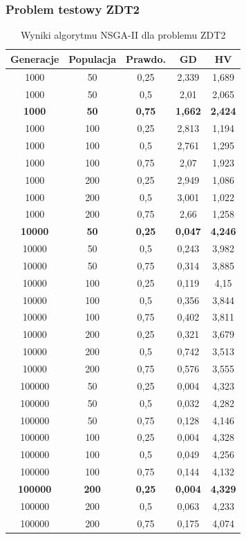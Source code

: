 \documentclass{classrep}
\begin{document}
\subsubsection{Problem testowy ZDT2}

\begin{table}[H]
\centering
\caption{Wyniki algorytmu NSGA-II dla problemu ZDT2}
\label{tab:NSGAII_ZDT2}
\begin{tabular}{|ccc|c|c|}
\hline
\textbf{Generacje} & \textbf{Populacja} & \textbf{Prawdo.} & \textbf{GD} & \textbf{HV} \\ \hline
1000 & 50 & 0,25 & 2,339 & 1,689 \\ \hline
1000 & 50 & 0,5 & 2,01 & 2,065 \\ \hline
\textbf{1000} & \textbf{50} & \textbf{0,75} & \textbf{1,662} & \textbf{2,424} \\ \hline
1000 & 100 & 0,25 & 2,813 & 1,194 \\ \hline
1000 & 100 & 0,5 & 2,761 & 1,295 \\ \hline
1000 & 100 & 0,75 & 2,07 & 1,923 \\ \hline
1000 & 200 & 0,25 & 2,949 & 1,086 \\ \hline
1000 & 200 & 0,5 & 3,001 & 1,022 \\ \hline
1000 & 200 & 0,75 & 2,66 & 1,258 \\ \hline
\textbf{10000} & \textbf{50} & \textbf{0,25} & \textbf{0,047} & \textbf{4,246} \\ \hline
10000 & 50 & 0,5 & 0,243 & 3,982 \\ \hline
10000 & 50 & 0,75 & 0,314 & 3,885 \\ \hline
10000 & 100 & 0,25 & 0,119 & 4,15 \\ \hline
10000 & 100 & 0,5 & 0,356 & 3,844 \\ \hline
10000 & 100 & 0,75 & 0,402 & 3,811 \\ \hline
10000 & 200 & 0,25 & 0,321 & 3,679 \\ \hline
10000 & 200 & 0,5 & 0,742 & 3,513 \\ \hline
10000 & 200 & 0,75 & 0,576 & 3,555 \\ \hline
100000 & 50 & 0,25 & 0,004 & 4,323 \\ \hline
100000 & 50 & 0,5 & 0,032 & 4,282 \\ \hline
100000 & 50 & 0,75 & 0,128 & 4,146 \\ \hline
100000 & 100 & 0,25 & 0,004 & 4,328 \\ \hline
100000 & 100 & 0,5 & 0,049 & 4,256 \\ \hline
100000 & 100 & 0,75 & 0,144 & 4,132 \\ \hline
\textbf{100000} & \textbf{200} & \textbf{0,25} & \textbf{0,004} & \textbf{4,329} \\ \hline
100000 & 200 & 0,5 & 0,063 & 4,233 \\ \hline
100000 & 200 & 0,75 & 0,175 & 4,074 \\ \hline
\end{tabular}
\end{table}
\end{document}
